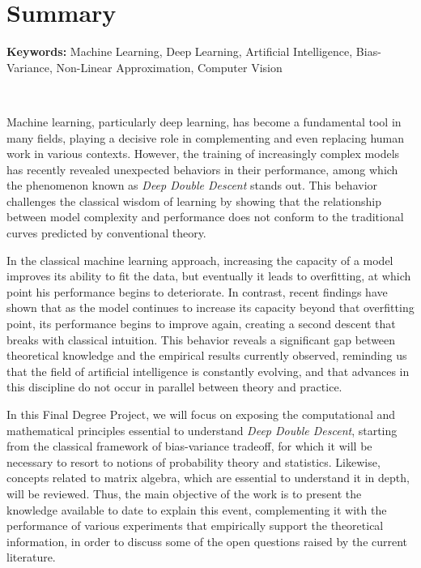 %

\chapter{Summary}

\noindent\textbf{Keywords:} Machine Learning, Deep Learning, Artificial Intelligence, Bias-Variance, Non-Linear Approximation, Computer Vision

\

Machine learning, particularly deep learning, has become a fundamental tool in many fields, playing a decisive role in complementing and even replacing human work in various contexts. However, the training of increasingly complex models has recently revealed unexpected behaviors in their performance, among which the phenomenon known as \emph{Deep Double Descent} stands out. This behavior challenges the classical wisdom of learning by showing that the relationship between model complexity and performance does not conform to the traditional curves predicted by conventional theory.\newline

In the classical machine learning approach, increasing the capacity of a model improves its ability to fit the data, but eventually it leads to overfitting, at which point his performance begins to deteriorate. In contrast, recent findings have shown that as the model continues to increase its capacity beyond that overfitting point, its performance begins to improve again, creating a second descent that breaks with classical intuition. This behavior reveals a significant gap between theoretical knowledge and the empirical results currently observed, reminding us that the field of artificial intelligence is constantly evolving, and that advances in this discipline do not occur in parallel between theory and practice.\newline

In this Final Degree Project, we will focus on exposing the computational and mathematical principles essential to understand \emph{Deep Double Descent}, starting from the classical framework of bias-variance tradeoff, for which it will be necessary to resort to notions of probability theory and statistics. Likewise, concepts related to matrix algebra, which are essential to understand it in depth, will be reviewed. Thus, the main objective of the work is to present the knowledge available to date to explain this event, complementing it with the performance of various experiments that empirically support the theoretical information, in order to discuss some of the open questions raised by the current literature.\newline

